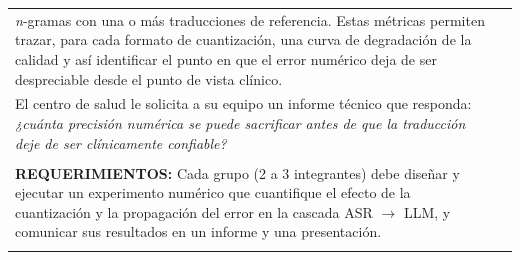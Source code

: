 \documentclass[12pt]{article}
\begin{document}
\begin{longtable}{|p{\textwidth}|@{}c@{}}
  \textit{n}-gramas con una o más traducciones de referencia. Estas métricas permiten trazar, para cada formato
  de cuantización, una curva de degradación de la calidad y así identificar el punto en que el error numérico
  deja de ser despreciable desde el punto de vista clínico.&\\
  El centro de salud le solicita a su equipo un informe técnico que responda: \textit{¿cuánta precisión
  numérica se puede sacrificar antes de que la traducción deje de ser clínicamente confiable?}&\\
  &\\
  \textbf{REQUERIMIENTOS:}
  \vspace{3pt}
  Cada grupo (2 a 3 integrantes) debe diseñar y ejecutar un experimento numérico que cuantifique el
  efecto de la cuantización y la propagación del error en la cascada ASR $\to$ LLM, y comunicar sus
  resultados en un informe y una presentación.&\\&\\\hline
\end{longtable}
\end{document}
